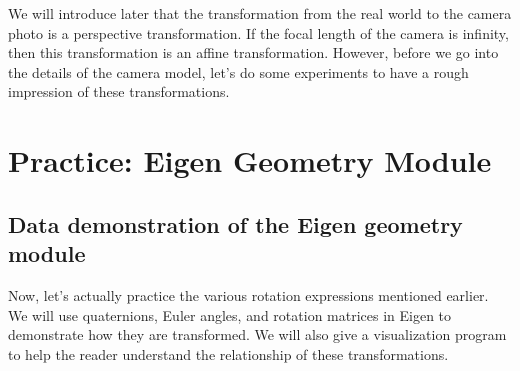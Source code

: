 We will introduce later that the transformation from the real world to the camera photo is a perspective transformation. If the focal length of the camera is infinity, then this transformation is an affine transformation. However, before we go into the details of the camera model, let's do some experiments to have a rough impression of these transformations.

\section{Practice: Eigen Geometry Module}
\subsection{Data demonstration of the Eigen geometry module}

Now, let's actually practice the various rotation expressions mentioned earlier. We will use quaternions, Euler angles, and rotation matrices in Eigen to demonstrate how they are transformed. We will also give a visualization program to help the reader understand the relationship of these transformations.

